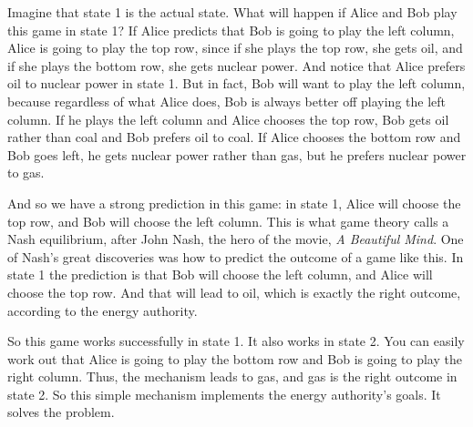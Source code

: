 \documentclass[12pt,a4paper]{article}
\newenvironment{original}{%
  \par\vspace{4pt}\noindent%
  \color{black}%
  \ignorespaces
}{%
  \par\vspace{2pt}%
}
\begin{document}
\begin{original}
Imagine that state 1 is the actual state. What will happen if Alice and Bob play this game in state 1? If Alice predicts that Bob is going to play the left column, Alice is going to play the top row, since if she plays the top row, she gets oil, and if she plays the bottom row, she gets nuclear power. And notice that Alice prefers oil to nuclear power in state 1. But in fact, Bob will want to play the left column, because regardless of what Alice does, Bob is always better off playing the left column. If he plays the left column and Alice chooses the top row, Bob gets oil rather than coal and Bob prefers oil to coal. If Alice chooses the bottom row and Bob goes left, he gets nuclear power rather than gas, but he prefers nuclear power to gas.

And so we have a strong prediction in this game: in state 1, Alice will choose the top row, and Bob will choose the left column. This is what game theory calls a Nash equilibrium, after John Nash, the hero of the movie, \textit{A Beautiful Mind}. One of Nash's great discoveries was how to predict the outcome of a game like this. In state 1 the prediction is that Bob will choose the left column, and Alice will choose the top row. And that will lead to oil, which is exactly the right outcome, according to the energy authority.

So this game works successfully in state 1. It also works in state 2. You can easily work out that Alice is going to play the bottom row and Bob is going to play the right column. Thus, the mechanism leads to gas, and gas is the right outcome in state 2. So this simple mechanism implements the energy authority's goals. It solves the problem.
\end{original}
\end{document}
